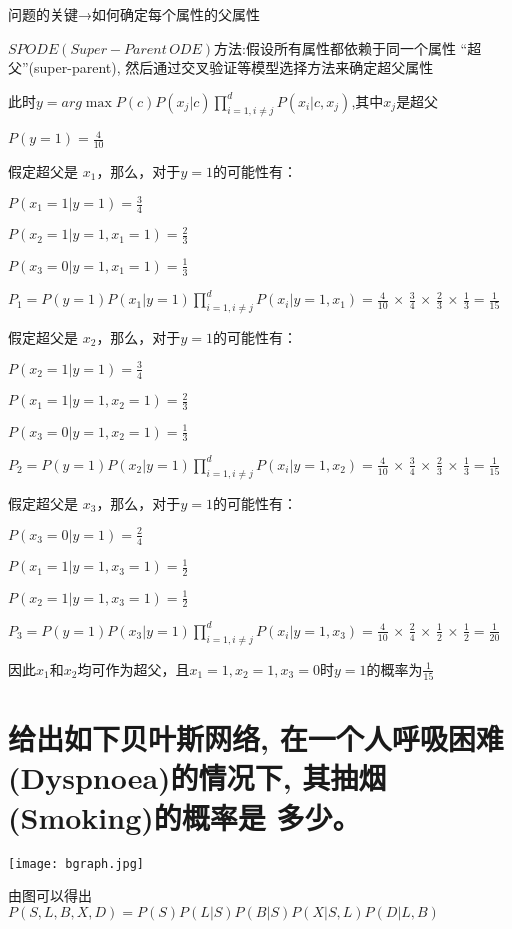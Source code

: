 \documentclass[UTF8]{ctexart}
\begin{document}
问题的关键→如何确定每个属性的父属性

$SPODE (Super-Parent \, ODE)$方法:假设所有属性都依赖于同一个属性 “超父”(super-parent), 然后通过交叉验证等模型选择方法来确定超父属性

此时$y=arg \mathop{max}P(c) P(x_j|c) \prod \limits_{i=1,i\neq j}^d P(x_i|c,x_j)$,其中$x_j$是超父

$P(y=1)=\frac{4}{10}$

假定超父是 $x_1$，那么，对于$ y=1 $的可能性有：

$P(x_1=1|y=1)=\frac{3}{4}$

$P(x_2=1|y=1,x_1=1)=\frac{2}{3}$

$P(x_3=0|y=1,x_1=1)=\frac{1}{3}$

$P_1=P(y=1) P(x_1|y=1) \prod \limits_{i=1,i\neq j}^d
  P(x_i|y=1,x_1)=\frac{4}{10}  \,×\, \frac{3}{4} \,×\,
  \frac{2}{3} \,×\,\frac{1}{3}=\frac{1}{15}$

假定超父是 $x_2$，那么，对于$ y=1 $的可能性有：

$P(x_2=1|y=1)=\frac{3}{4}$

$P(x_1=1|y=1,x_2=1)=\frac{2}{3}$

$P(x_3=0|y=1,x_2=1)=\frac{1}{3}$

$P_2=P(y=1) P(x_2|y=1) \prod \limits_{i=1,i\neq j}^d
  P(x_i|y=1,x_2)= \frac{4}{10} \,×\,\frac{3}{4} \,×\,
  \frac{2}{3}\,×\,\frac{1}{3}=\frac{1}{15}$

假定超父是 $x_3$，那么，对于$ y=1 $的可能性有：

$P(x_3=0|y=1)=\frac{2}{4}$

$P(x_1=1|y=1,x_3=1)=\frac{1}{2}$

$P(x_2=1|y=1,x_3=1)=\frac{1}{2}$

$P_3=P(y=1) P(x_3|y=1) \prod \limits_{i=1,i\neq j}^d
  P(x_i|y=1,x_3)=  \frac{4}{10}\,×\, \frac{2}{4} \,×\,
  \frac{1}{2} \,×\,\frac{1}{2}=\frac{1}{20}$

因此$x_1$和$x_2$均可作为超父，且$x_1=1,x_2=1,x_3=0$时$y=1$的概率为$\frac{1}{15}$

\pagestyle{plain}
\section{给出如下贝叶斯网络, 在一个人呼吸困难
  (Dyspnoea)的情况下, 其抽烟(Smoking)的概率是
  多少。}
\texttt{[image: bgraph.jpg]}

由图可以得出$P(S,L,B,X,D)=P(S)P(L|S)P(B|S)P(X|S,L)P(D|L,B)$

\end{document}
